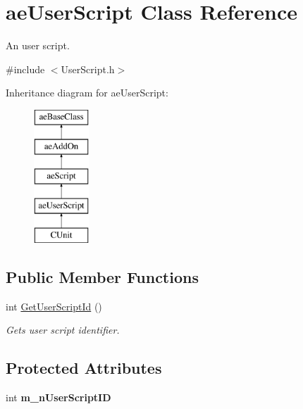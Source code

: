 \hypertarget{classae_user_script}{}\section{ae\+User\+Script Class Reference}
\label{classae_user_script}


An user script.  




{\ttfamily \#include $<$User\+Script.\+h$>$}

Inheritance diagram for ae\+User\+Script\+:\begin{figure}[H]
\begin{center}
\leavevmode
\includegraphics[height=5.000000cm]{classae_user_script}
\end{center}
\end{figure}
\subsection*{Public Member Functions}
\begin{DoxyCompactItemize}
\item 
int \hyperlink{classae_user_script_a53400e3f0443470e8570ec3218c9a051}{Get\+User\+Script\+Id} ()
\begin{DoxyCompactList}\small\item\em Gets user script identifier. \end{DoxyCompactList}\end{DoxyCompactItemize}
\subsection*{Protected Attributes}
\begin{DoxyCompactItemize}
\item 
int {\bfseries m\+\_\+n\+User\+Script\+ID}\hypertarget{classae_user_script_a3b7e57c1b556b768efcaa2fa494bd764}{}\label{classae_user_script_a3b7e57c1b556b768efcaa2fa494bd764}

\end{DoxyCompactItemize}


